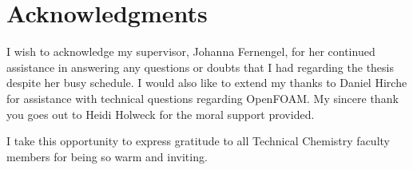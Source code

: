 \chapter*{Acknowledgments}
%
I wish to acknowledge my supervisor, Johanna Fernengel, for her continued assistance in answering any questions or doubts that I had regarding the thesis despite her busy schedule. I would also like to extend my thanks to Daniel Hirche for assistance with technical questions regarding OpenFOAM\textsuperscript{\textregistered}. My sincere thank you goes out to Heidi Holweck for the moral support provided.

I take this opportunity to express gratitude to all Technical Chemistry faculty members for being so warm and inviting.


\cleardoublepage